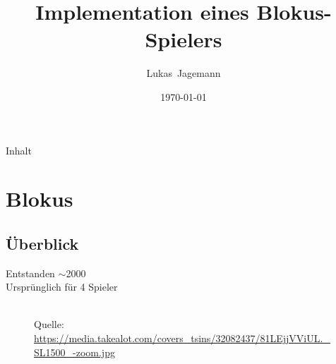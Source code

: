 \documentclass[12pt, draft]{beamer}
\title{Implementation eines Blokus-Spielers}
\author{\mbox{Lukas Jagemann}}
\date{\today}
\begin{document}
\begin{frame}
    \vspace*{-20pt}
    \titlepage
\end{frame}

\begin{frame}{Inhalt}
	\setcounter{tocdepth}{1}
    \tableofcontents
\end{frame}

\section{Blokus}
\subsection{Überblick}
\begin{frame}
	Entstanden $\sim$2000\\
	Ursprünglich für 4 Spieler
    \begin{figure}[tp]
        \centering
        \\
        \tiny Quelle: \url{https://media.takealot.com/covers\_tsins/32082437/81LEjjVViUL.\_SL1500\_-zoom.jpg}
    \end{figure}
\end{frame}
\end{document}
